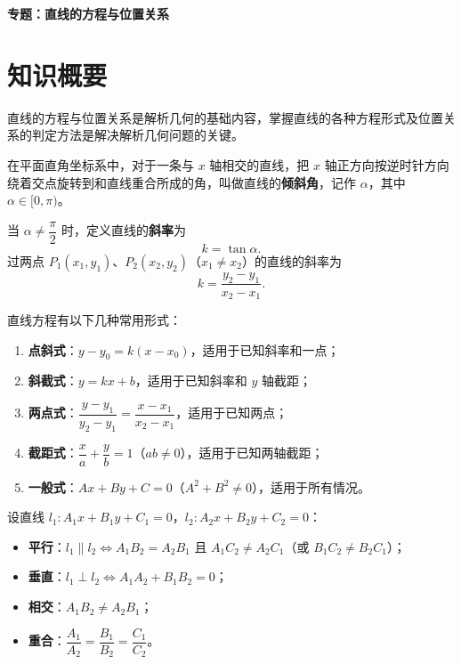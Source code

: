 \documentclass[11pt]{ctexrep}
\begin{document}
\begin{center}
    {\LARGE\bfseries 专题：直线的方程与位置关系}
\end{center}

\section*{知识概要}

直线的方程与位置关系是解析几何的基础内容，掌握直线的各种方程形式及位置关系的判定方法是解决解析几何问题的关键。

\begin{definition}[直线的倾斜角与斜率]
    在平面直角坐标系中，对于一条与 $x$ 轴相交的直线，把 $x$ 轴正方向按逆时针方向绕着交点旋转到和直线重合所成的角，叫做直线的\textbf{倾斜角}，记作 $\alpha$，其中 $\alpha \in [0, \pi)$。
    
    当 $\alpha \neq \dfrac{\pi}{2}$ 时，定义直线的\textbf{斜率}为
    \[
        k = \tan\alpha.
    \]
    过两点 $P_1(x_1, y_1)$、$P_2(x_2, y_2)$（$x_1 \neq x_2$）的直线的斜率为
    \[
        k = \frac{y_2 - y_1}{x_2 - x_1}.
    \]
\end{definition}

\begin{property}[直线的方程形式]
    直线方程有以下几种常用形式：
    \begin{enumerate}
        \item \textbf{点斜式}：$y - y_0 = k(x - x_0)$，适用于已知斜率和一点；
        \item \textbf{斜截式}：$y = kx + b$，适用于已知斜率和 $y$ 轴截距；
        \item \textbf{两点式}：$\dfrac{y - y_1}{y_2 - y_1} = \dfrac{x - x_1}{x_2 - x_1}$，适用于已知两点；
        \item \textbf{截距式}：$\dfrac{x}{a} + \dfrac{y}{b} = 1$（$ab \neq 0$），适用于已知两轴截距；
        \item \textbf{一般式}：$Ax + By + C = 0$（$A^2 + B^2 \neq 0$），适用于所有情况。
    \end{enumerate}
\end{property}

\begin{property}[两直线的位置关系]
    设直线 $l_1: A_1x + B_1y + C_1 = 0$，$l_2: A_2x + B_2y + C_2 = 0$：
    \begin{itemize}
        \item \textbf{平行}：$l_1 \parallel l_2 \Leftrightarrow A_1B_2 = A_2B_1$ 且 $A_1C_2 \neq A_2C_1$（或 $B_1C_2 \neq B_2C_1$）；
        \item \textbf{垂直}：$l_1 \perp l_2 \Leftrightarrow A_1A_2 + B_1B_2 = 0$；
        \item \textbf{相交}：$A_1B_2 \neq A_2B_1$；
        \item \textbf{重合}：$\dfrac{A_1}{A_2} = \dfrac{B_1}{B_2} = \dfrac{C_1}{C_2}$。
    \end{itemize}
\end{property}
\end{document}
